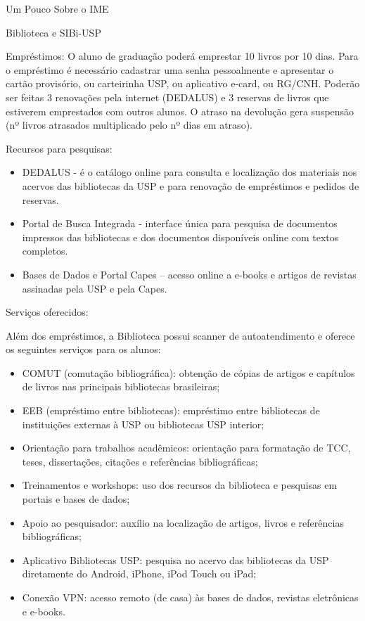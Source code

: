 \begin{secao}{Um Pouco Sobre o IME}
\begin{subsecao}{Biblioteca e SIBi-USP}
\begin{subsubsecao}{Empréstimos:}
O aluno de graduação poderá emprestar 10 livros por 10 dias. Para o empréstimo é necessário cadastrar uma senha pessoalmente e apresentar o cartão provisório, ou carteirinha USP, ou aplicativo e-card, ou RG/CNH. Poderão ser feitas 3 renovações pela internet (DEDALUS) e 3 reservas de livros que estiverem emprestados com outros alunos. O atraso na devolução gera suspensão (nº livros atrasados multiplicado pelo nº dias em atraso). 
\end{subsubsecao}

\begin{subsubsecao}{Recursos para pesquisas:}
\begin{itemize}
    \item DEDALUS - é o catálogo online para consulta e localização dos materiais nos acervos das bibliotecas da USP e para renovação de empréstimos e pedidos de reservas. 
    \item Portal de Busca Integrada - interface única para pesquisa de documentos impressos das bibliotecas e dos documentos disponíveis online com textos completos. 
    \item Bases de Dados e Portal Capes – acesso online a e-books e artigos de revistas assinadas pela USP e pela Capes.
    \end{itemize}
\end{subsubsecao}

\begin{subsubsecao}{Serviços oferecidos:}

Além dos empréstimos, a Biblioteca possui scanner de autoatendimento e oferece os seguintes serviços para os alunos:
\begin{itemize}
    \item COMUT (comutação bibliográfica): obtenção de cópias de artigos e capítulos de livros nas principais bibliotecas brasileiras; 
    \item EEB (empréstimo entre bibliotecas): empréstimo entre bibliotecas de instituições externas à USP ou bibliotecas USP interior;
    \item Orientação para trabalhos acadêmicos: orientação para formatação de TCC, teses, dissertações, citações e referências bibliográficas;
    \item Treinamentos e workshops: uso dos recursos da biblioteca e pesquisas em portais e bases de dados;
    \item Apoio ao pesquisador: auxílio na localização de artigos, livros e referências bibliográficas;
    \item Aplicativo Bibliotecas USP: pesquisa no acervo das bibliotecas da USP diretamente do Android, iPhone, iPod Touch ou iPad; 
    \item Conexão VPN: acesso remoto (de casa) às bases de dados, revistas eletrônicas e e-books.
\end{itemize}
\end{subsubsecao}


\end{subsecao}
\end{secao}
